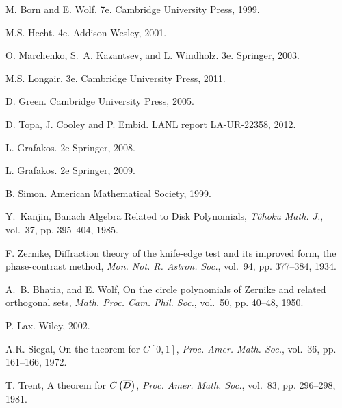\documentclass[preprint,12pt]{elsarticle}
\begin{document}
\begin{thebibliography}{00}


 M. Born and E. Wolf.
 7e.
\newblock  Cambridge University Press, 1999.
  
 M.S. Hecht.
 4e.
\newblock  Addison Wesley, 2001.

 O. Marchenko, S.~A. Kazantsev, and L. Windholz.
 3e.
\newblock  Springer, 2003.

 M.S. Longair.
 3e.
\newblock  Cambridge University Press, 2011.

 D. Green.
\newblock  Cambridge University Press, 2005.

 D. Topa, J. Cooley and P. Embid.
\newblock  LANL report LA-UR-22358, 2012.

 L. Grafakos.
 2e
\newblock  Springer, 2008.

 L. Grafakos.
 2e
\newblock  Springer, 2009.

 B. Simon.
\newblock  American Mathematical Society, 1999.

Y.~Kanjin, Banach Algebra Related to Disk Polynomials, 
\emph{T\^ohoku Math. J.}, vol.~37, pp. 395--404, 1985.

F. Zernike, Diffraction theory of the knife-edge test and its improved form, the phase-contrast method, 
\emph{Mon. Not. R. Astron. Soc.}, vol.~94, pp. 377--384, 1934.

A.~B. Bhatia, and E. Wolf, On the circle polynomials of Zernike and related orthogonal sets, 
\emph{Math. Proc. Cam. Phil. Soc.}, vol.~50, pp. 40--48, 1950.

 P. Lax.
\newblock  Wiley, 2002.

A.R. Siegal, On the \mst theorem for $C[0,1]$, 
\emph{Proc. Amer. Math. Soc.}, vol.~36, pp. 161--166, 1972.

T. Trent, A \mst theorem for $C\left( \overline{D} \right)$, 
\emph{Proc. Amer. Math. Soc.}, vol.~83, pp. 296--298, 1981.

\end{thebibliography}
\end{document}

